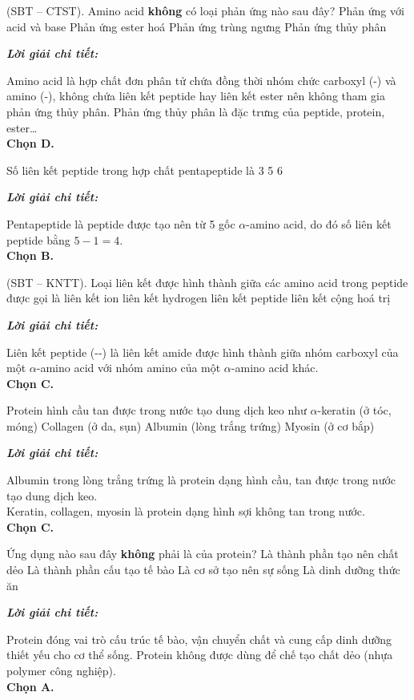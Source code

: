 \documentclass[11pt,a4paper]{article}
\def\loigiai#1{
\par\begingroup\color{blue!80!black}\small
\noindent\textbf{\textit{Lời giải chi tiết:}}\par
#1\par\endgroup}
\begin{document}
\begin{ex}
(SBT -- CTST). Amino acid \textbf{không} có loại phản ứng nào sau đây?
\choice
{Phản ứng với acid và base}
{Phản ứng ester hoá}
{Phản ứng trùng ngưng}
{\True Phản ứng thủy phân}
\loigiai{
Amino acid là hợp chất đơn phân tử chứa đồng thời nhóm chức carboxyl (-\ce{COOH}) và amino (-\ce{NH2}), không chứa liên kết peptide hay liên kết ester nên không tham gia phản ứng thủy phân. Phản ứng thủy phân là đặc trưng của peptide, protein, ester\dots\\
\textbf{Chọn D.}}
\end{ex}

\begin{ex}
Số liên kết peptide trong hợp chất pentapeptide là
\choice
{3}
{}
{5}
{6}
\loigiai{
Pentapeptide là peptide được tạo nên từ 5 gốc $\alpha$-amino acid, do đó số liên kết peptide bằng $5 - 1 = 4$.\\
\textbf{Chọn B.}}
\end{ex}

\begin{ex}
(SBT -- KNTT). Loại liên kết được hình thành giữa các amino acid trong peptide được gọi là
\choice
{liên kết ion}
{liên kết hydrogen}
{\True liên kết peptide}
{liên kết cộng hoá trị}
\loigiai{
Liên kết peptide (--) là liên kết amide được hình thành giữa nhóm carboxyl của một $\alpha$-amino acid với nhóm amino của một $\alpha$-amino acid khác.\\
\textbf{Chọn C.}}
\end{ex}

\begin{ex}
Protein hình cầu tan được trong nước tạo dung dịch keo như
\choice
{$\alpha$-keratin (ở tóc, móng)}
{Collagen (ở da, sụn)}
{\True Albumin (lòng trắng trứng)}
{Myosin (ở cơ bắp)}
\loigiai{
Albumin trong lòng trắng trứng là protein dạng hình cầu, tan được trong nước tạo dung dịch keo.\\
Keratin, collagen, myosin là protein dạng hình sợi không tan trong nước.\\
\textbf{Chọn C.}}
\end{ex}

\begin{ex}
Ứng dụng nào sau đây \textbf{không} phải là của protein?
\choice
{\True Là thành phần tạo nên chất dẻo}
{Là thành phần cấu tạo tế bào}
{Là cơ sở tạo nên sự sống}
{Là dinh dưỡng thức ăn}
\loigiai{
Protein đóng vai trò cấu trúc tế bào, vận chuyển chất và cung cấp dinh dưỡng thiết yếu cho cơ thể sống. Protein không được dùng để chế tạo chất dẻo (nhựa polymer công nghiệp).\\
\textbf{Chọn A.}}
\end{ex}
\end{document}
